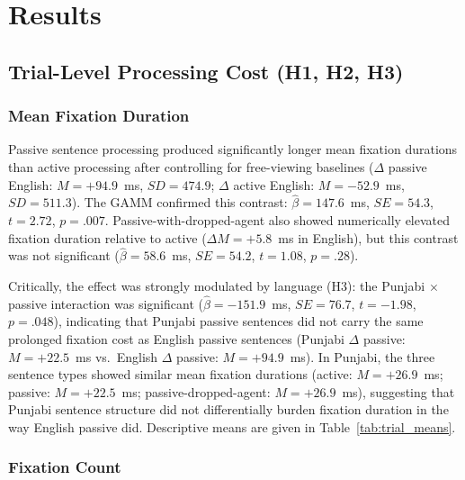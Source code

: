 \documentclass[12pt, a4paper]{article}
\begin{document}
\section{Results}

\subsection{Trial-Level Processing Cost (H1, H2, H3)}

\subsubsection{Mean Fixation Duration}

Passive sentence processing produced significantly longer mean fixation
durations than active processing after controlling for free-viewing baselines
($\Delta$ passive English: $M = +94.9$~ms, $SD = 474.9$; $\Delta$ active
English: $M = -52.9$~ms, $SD = 511.3$).
The GAMM confirmed this contrast:
$\hat{\beta} = 147.6$~ms, $SE = 54.3$, $t = 2.72$, $p = .007$.
Passive-with-dropped-agent also showed numerically elevated fixation
duration relative to active ($\Delta M = +5.8$~ms in English), but this
contrast was not significant ($\hat{\beta} = 58.6$~ms, $SE = 54.2$, $t = 1.08$, $p = .28$).

Critically, the effect was strongly modulated by language (H3):
the Punjabi $\times$ passive interaction was significant
($\hat{\beta} = -151.9$~ms, $SE = 76.7$, $t = -1.98$, $p = .048$),
indicating that Punjabi passive sentences did not carry the same prolonged
fixation cost as English passive sentences
(Punjabi $\Delta$ passive: $M = +22.5$~ms vs.\ English $\Delta$ passive:
$M = +94.9$~ms).
In Punjabi, the three sentence types showed similar mean fixation durations
(active: $M = +26.9$~ms; passive: $M = +22.5$~ms; passive-dropped-agent:
$M = +26.9$~ms), suggesting that Punjabi sentence structure did not
differentially burden fixation duration in the way English passive did.
Descriptive means are given in Table~\ref{tab:trial_means}.

\subsubsection{Fixation Count}
\end{document}
